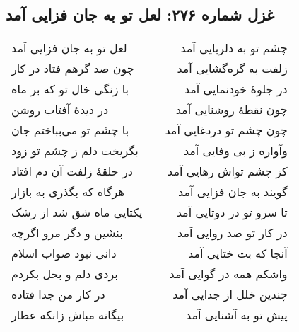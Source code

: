 \begin{center}
\section*{غزل شماره ۲۷۶: لعل تو به جان فزایی آمد}
\label{sec:276}
\begin{longtable}{l p{0.5cm} r}
لعل تو به جان فزایی آمد
&&
چشم تو به دلربایی آمد
\\
چون صد گرهم فتاد در کار
&&
زلفت به گره‌گشایی آمد
\\
با زنگی خال تو که بر ماه
&&
در جلوهٔ خودنمایی آمد
\\
در دیدهٔ آفتاب روشن
&&
چون نقطهٔ روشنایی آمد
\\
با چشم تو می‌بباختم جان
&&
چون چشم تو دردغایی آمد
\\
بگریخت دلم ز چشم تو زود
&&
وآواره ز بی وفایی آمد
\\
در حلقهٔ زلفت آن دم افتاد
&&
کز چشم تواش رهایی آمد
\\
هرگاه که بگذری به بازار
&&
گویند به جان فزایی آمد
\\
یکتایی ماه شق شد از رشک
&&
تا سرو تو در دوتایی آمد
\\
بنشین و دگر مرو اگرچه
&&
در کار تو صد روایی آمد
\\
دانی نبود صواب اسلام
&&
آنجا که بت ختایی آمد
\\
بردی دلم و بحل بکردم
&&
واشکم همه در گوایی آمد
\\
در کار من جدا فتاده
&&
چندین خلل از جدایی آمد
\\
بیگانه مباش زانکه عطار
&&
پیش تو به آشنایی آمد
\\
\end{longtable}
\end{center}

